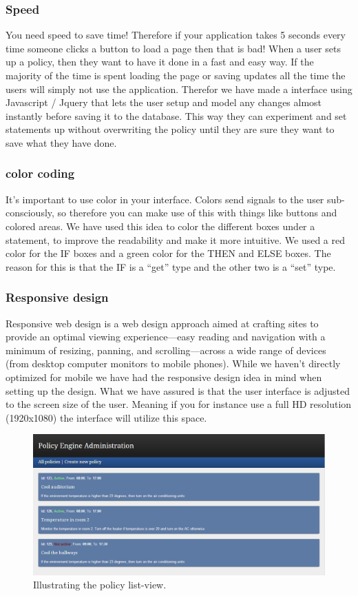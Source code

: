 \subsubsection{Speed}
You need speed to save time! Therefore if your application takes 5 seconds every time someone clicks a button to load a page then that is bad! When a user sets up a policy, then they want to have it done in a fast and easy way. If the majority of the time is spent loading the page or saving updates all the time the users will simply not use the application. Therefor we have made a interface using Javascript / Jquery that lets the user setup and model any changes almost instantly before saving it to the database. This way they can experiment and set statements up without overwriting the policy until they are sure they want to save what they have done.

\subsubsection{color coding}
It's important to use color in your interface. Colors send signals to the user sub-consciously, so therefore you can make use of this with things like buttons and colored areas. We have used this idea to color the different boxes under a statement, to improve the readability and make it more intuitive. We used a red color for the IF boxes and a green color for the THEN and ELSE boxes. The reason for this is that the IF is a "`get"' type and the other two is a "`set"' type.

\subsubsection{Responsive design}
Responsive web design is a web design approach aimed at crafting sites to provide an optimal viewing experience—easy reading and navigation with a minimum of resizing, panning, and scrolling—across a wide range of devices (from desktop computer monitors to mobile phones). While we haven't directly optimized for mobile we have had the responsive design idea in mind when setting up the design. What we have assured is that the user interface is adjusted to the screen size of the user. Meaning if you for instance use a full HD resolution (1920x1080) the interface will utilize this space.

\begin{figure}[ht]
\centering
\includegraphics[width=\columnwidth]{policylist.png}
\caption{Illustrating the policy list-view.}
\label{fig:policylist}
\end{figure}

